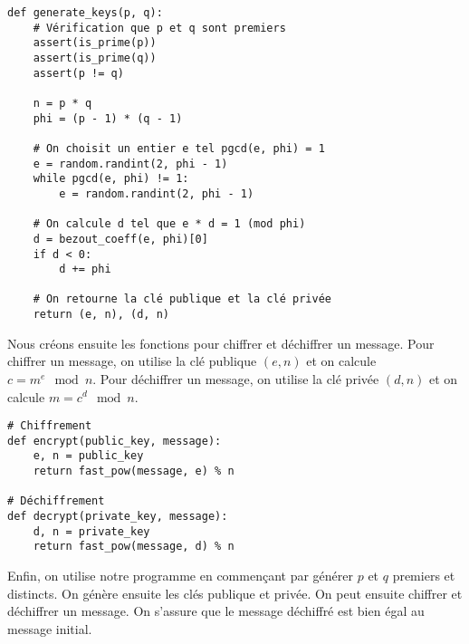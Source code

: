 \begin{tcolorbox}[
    enhanced,
    attach boxed title to top left={xshift=6mm,yshift=-3mm},
    colback=lightgreen!20,
    colframe=lightgreen,
    colbacktitle=lightgreen,
    title=Génération de la clé publique et privée,
    fonttitle=\bfseries\color{black},
    boxed title style={size=small,colframe=lightgreen,sharp corners},
    sharp corners,
]    
    \begin{verbatim}
def generate_keys(p, q):
    # Vérification que p et q sont premiers
    assert(is_prime(p))
    assert(is_prime(q))
    assert(p != q)

    n = p * q
    phi = (p - 1) * (q - 1)

    # On choisit un entier e tel pgcd(e, phi) = 1
    e = random.randint(2, phi - 1)
    while pgcd(e, phi) != 1:
        e = random.randint(2, phi - 1)

    # On calcule d tel que e * d = 1 (mod phi)
    d = bezout_coeff(e, phi)[0]
    if d < 0:
        d += phi

    # On retourne la clé publique et la clé privée
    return (e, n), (d, n)
    \end{verbatim}
\end{tcolorbox}

Nous créons ensuite les fonctions pour chiffrer et déchiffrer un message. Pour chiffrer un message, on utilise la clé publique $(e, n)$ et on calcule $c = m^e \mod n$. Pour déchiffrer un message, on utilise la clé privée $(d, n)$ et on calcule $m = c^d \mod n$. \\

\begin{tcolorbox}[
    enhanced,
    attach boxed title to top left={xshift=6mm,yshift=-3mm},
    colback=lightgreen!20,
    colframe=lightgreen,
    colbacktitle=lightgreen,
    title=Chiffrement et déchiffrement d'un message,
    fonttitle=\bfseries\color{black},
    boxed title style={size=small,colframe=lightgreen,sharp corners},
    sharp corners,
]    
    \begin{verbatim}
# Chiffrement
def encrypt(public_key, message):
    e, n = public_key
    return fast_pow(message, e) % n

# Déchiffrement
def decrypt(private_key, message):
    d, n = private_key
    return fast_pow(message, d) % n
    \end{verbatim}
\end{tcolorbox}

Enfin, on utilise notre programme en commençant par générer $p$ et $q$ premiers et distincts. On génère ensuite les clés publique et privée. On peut ensuite chiffrer et déchiffrer un message. On s'assure que le message déchiffré est bien égal au message initial. \\

